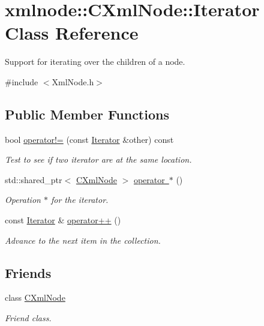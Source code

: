 \hypertarget{classxmlnode_1_1_c_xml_node_1_1_iterator}{}\section{xmlnode\+::C\+Xml\+Node\+::Iterator Class Reference}
\label{classxmlnode_1_1_c_xml_node_1_1_iterator}


Support for iterating over the children of a node.  




{\ttfamily \#include $<$Xml\+Node.\+h$>$}

\subsection*{Public Member Functions}
\begin{DoxyCompactItemize}
\item 
bool \mbox{\hyperlink{classxmlnode_1_1_c_xml_node_1_1_iterator_a55c86e64262a6ef16e253f2aef70578c}{operator!=}} (const \mbox{\hyperlink{classxmlnode_1_1_c_xml_node_1_1_iterator}{Iterator}} \&other) const
\begin{DoxyCompactList}\small\item\em Test to see if two iterator are at the same location. \end{DoxyCompactList}\item 
std\+::shared\+\_\+ptr$<$ \mbox{\hyperlink{classxmlnode_1_1_c_xml_node}{C\+Xml\+Node}} $>$ \mbox{\hyperlink{classxmlnode_1_1_c_xml_node_1_1_iterator_a63743812f3b36b3eff65ee5038674b45}{operator $\ast$}} ()
\begin{DoxyCompactList}\small\item\em Operation $\ast$ for the iterator. \end{DoxyCompactList}\item 
const \mbox{\hyperlink{classxmlnode_1_1_c_xml_node_1_1_iterator}{Iterator}} \& \mbox{\hyperlink{classxmlnode_1_1_c_xml_node_1_1_iterator_aefa7392f7c198dcf907d8458fbf0db1a}{operator++}} ()
\begin{DoxyCompactList}\small\item\em Advance to the next item in the collection. \end{DoxyCompactList}\end{DoxyCompactItemize}
\subsection*{Friends}
\begin{DoxyCompactItemize}
\item 
\mbox{\label{classxmlnode_1_1_c_xml_node_1_1_iterator_a770307dc9d4e2e7005bcf200bae3066a}} 
class \mbox{\hyperlink{classxmlnode_1_1_c_xml_node_1_1_iterator_a770307dc9d4e2e7005bcf200bae3066a}{C\+Xml\+Node}}
\begin{DoxyCompactList}\small\item\em Friend class. \end{DoxyCompactList}\end{DoxyCompactItemize}


